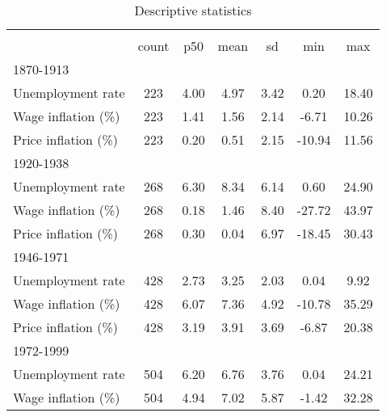 \begin{table}[htbp]\centering
\def\sym#1{\ifmmode^{#1}\else\(^{#1}\)\fi}
\caption{Descriptive statistics \label{T:DescriptivesW}}
\begin{tabular}{l*{1}{cccccc}}
\hline\hline
                    &\multicolumn{6}{c}{}                                                         \\
                    &       count&         p50&        mean&          sd&         min&         max\\
\hline
1870-1913           &            &            &            &            &            &            \\
Unemployment rate   &         223&        4.00&        4.97&        3.42&        0.20&       18.40\\
Wage inflation (\%) &         223&        1.41&        1.56&        2.14&       -6.71&       10.26\\
Price inflation (\%)&         223&        0.20&        0.51&        2.15&      -10.94&       11.56\\
\hline
1920-1938           &            &            &            &            &            &            \\
Unemployment rate   &         268&        6.30&        8.34&        6.14&        0.60&       24.90\\
Wage inflation (\%) &         268&        0.18&        1.46&        8.40&      -27.72&       43.97\\
Price inflation (\%)&         268&        0.30&        0.04&        6.97&      -18.45&       30.43\\
\hline
1946-1971           &            &            &            &            &            &            \\
Unemployment rate   &         428&        2.73&        3.25&        2.03&        0.04&        9.92\\
Wage inflation (\%) &         428&        6.07&        7.36&        4.92&      -10.78&       35.29\\
Price inflation (\%)&         428&        3.19&        3.91&        3.69&       -6.87&       20.38\\
\hline
1972-1999           &            &            &            &            &            &            \\
Unemployment rate   &         504&        6.20&        6.76&        3.76&        0.04&       24.21\\
Wage inflation (\%) &         504&        4.94&        7.02&        5.87&       -1.42&       32.28\\

\end{tabular}
\end{table}
